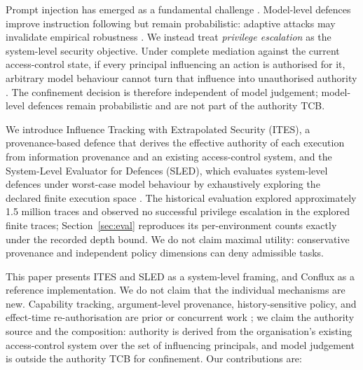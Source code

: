 \documentclass[11pt]{article}
\begin{document}
Prompt injection has emerged as a fundamental challenge
\citep{struq,spotlighting,neuralexec}. Model-level defences improve
instruction following but remain probabilistic: adaptive attacks may
invalidate empirical robustness
\citep{criticaleval,detectprompt,poisoningalignment,checkpointgcg}. We
instead treat \emph{privilege escalation} as the system-level security
objective. Under complete mediation against the current access-control
state, if every principal influencing an action is authorised for it,
arbitrary model behaviour cannot turn that influence into unauthorised
authority \citep{provos2003,davi2010}. The confinement decision is therefore
independent of model judgement; model-level defences remain probabilistic and
are not part of the authority TCB.

We introduce Influence Tracking with Extrapolated Security (ITES), a
provenance-based defence that derives the effective authority of each
execution from information provenance and an existing access-control system,
and the System-Level Evaluator for Defences (SLED), which evaluates
system-level defences under worst-case model behaviour by exhaustively
exploring the declared finite execution space \citep{earlycategorization}. The
historical evaluation explored approximately 1.5 million traces and observed
no successful privilege escalation in the explored finite traces;
Section~\ref{sec:eval} reproduces its per-environment counts exactly under
the recorded depth bound. We do not claim maximal utility: conservative
provenance and independent policy dimensions can deny admissible tasks.

This paper presents ITES and SLED as a system-level framing, and Conflux as a
reference implementation. We do not claim that the individual mechanisms are
new. Capability tracking, argument-level provenance, history-sensitive policy,
and effect-time re-authorisation are prior or concurrent work
\citep{camel,pact,forge,zhu2026runtime,zheng2026apex}; we claim the authority
source and the composition: authority is derived from the organisation's
existing access-control system over the set of influencing principals, and
model judgement is outside the authority TCB for confinement. Our contributions
are:
\end{document}
